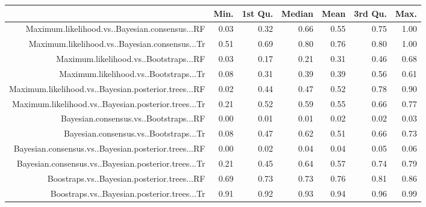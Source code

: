 \begin{table}[ht]
\centering
\begin{tabular}{rrrrrrr}
  \hline
 & Min. & 1st Qu. & Median & Mean & 3rd Qu. & Max. \\ 
  \hline
Maximum.likelihood.vs..Bayesian.consensus...RF & 0.03 & 0.32 & 0.66 & 0.55 & 0.75 & 1.00 \\ 
  Maximum.likelihood.vs..Bayesian.consensus...Tr & 0.51 & 0.69 & 0.80 & 0.76 & 0.80 & 1.00 \\ 
  Maximum.likelihood.vs..Bootstraps...RF & 0.03 & 0.17 & 0.21 & 0.31 & 0.46 & 0.68 \\ 
  Maximum.likelihood.vs..Bootstraps...Tr & 0.08 & 0.31 & 0.39 & 0.39 & 0.56 & 0.61 \\ 
  Maximum.likelihood.vs..Bayesian.posterior.trees...RF & 0.02 & 0.44 & 0.47 & 0.52 & 0.78 & 0.90 \\ 
  Maximum.likelihood.vs..Bayesian.posterior.trees...Tr & 0.21 & 0.52 & 0.59 & 0.55 & 0.66 & 0.77 \\ 
  Bayesian.consensus.vs..Bootstraps...RF & 0.00 & 0.01 & 0.01 & 0.02 & 0.02 & 0.03 \\ 
  Bayesian.consensus.vs..Bootstraps...Tr & 0.08 & 0.47 & 0.62 & 0.51 & 0.66 & 0.73 \\ 
  Bayesian.consensus.vs..Bayesian.posterior.trees...RF & 0.00 & 0.02 & 0.04 & 0.04 & 0.05 & 0.06 \\ 
  Bayesian.consensus.vs..Bayesian.posterior.trees...Tr & 0.21 & 0.45 & 0.64 & 0.57 & 0.74 & 0.79 \\ 
  Boostraps.vs..Bayesian.posterior.trees...RF & 0.69 & 0.73 & 0.73 & 0.76 & 0.81 & 0.86 \\ 
  Boostraps.vs..Bayesian.posterior.trees...Tr & 0.91 & 0.92 & 0.93 & 0.94 & 0.96 & 0.99 \\ 
   \hline
\end{tabular}
\end{table}